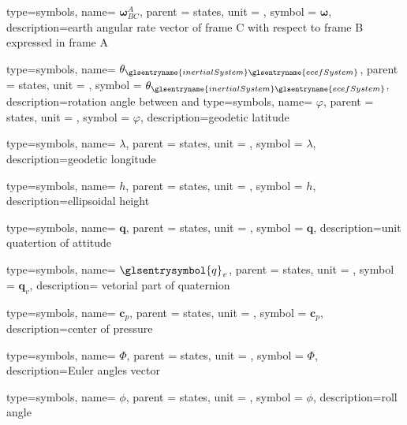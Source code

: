{type=symbols,
	name= \ensuremath{\boldsymbol{\omega}_{BC}^{A}},
	parent = {states},
	unit = \unexpanded{\si{\radian\per\second}},
	symbol = \ensuremath{\boldsymbol{\omega}},
	description={earth angular rate vector of frame C with respect to frame B expressed in frame A}
}

{type=symbols,
	name= \ensuremath{\theta_{\glsentryname{inertialSystem}\glsentryname{ecefSystem}}},
	parent = {states},
	unit = \unexpanded{\si{\radian\per\second}},
	symbol = \ensuremath{\theta_{\glsentryname{inertialSystem}\glsentryname{ecefSystem}}},
	description={rotation angle between  and }
}
{type=symbols,
	name= \ensuremath{\varphi},
	parent = {states},
	unit = \unexpanded{\si{\radian}},
	symbol = \ensuremath{\varphi},
	description={geodetic latitude}
}

{type=symbols,
	name= \ensuremath{\lambda},
	parent = {states},
	unit = \unexpanded{\si{\radian}},
	symbol = \ensuremath{\lambda},
	description={geodetic longitude}
}

{type=symbols,
	name= \ensuremath{h},
	parent = {states},
	unit = \unexpanded{\si{\meter}},
	symbol = \ensuremath{h},
	description={ellipsoidal height}
}


{type=symbols,
	name= \ensuremath{\mathbf{q}},
	parent = {states},
	unit = \unexpanded{},
	symbol = \ensuremath{\mathbf{q}},
	description={unit quatertion of attitude}
}

{type=symbols,
	name= \ensuremath{\glsentrysymbol{q}_v},
	parent = {states},
	unit = {},
	symbol = \ensuremath{\mathbf{q}_v},
	description={ vetorial part of quaternion }
}

{type=symbols,
	name= \ensuremath{\mathbf{c}_p},
	parent = {states},
	unit = \unexpanded{\si{\meter}},
	symbol = \ensuremath{\mathbf{c}_p},
	description={center of pressure}
}

{type=symbols,
	name= \ensuremath{\boldsymbol{\varPhi}},
	parent = {states},
	unit = \unexpanded{\si{\radian\per\second}},
	symbol = \ensuremath{\boldsymbol{\varPhi}},
	description={Euler angles vector}
}

{type=symbols,
	name= \ensuremath{\phi},
	parent = {states},
	unit = \unexpanded{\si{\radian}},
	symbol = \ensuremath{\phi},
	description={roll angle}
}


